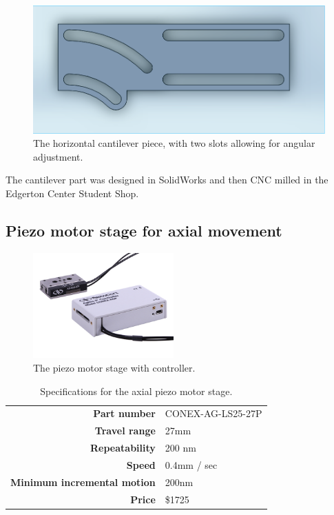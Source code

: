 \begin{figure}[h!]
\centering
\includegraphics[width=1.0\textwidth]{Images/Alignment/horizontal_part.png}
\caption{The horizontal cantilever piece, with two slots allowing for angular adjustment.}
\end{figure}

The cantilever part was designed in SolidWorks and then CNC milled in the Edgerton Center Student Shop.

\subsection{Piezo motor stage for axial movement}

\begin{figure}[h!]
\centering
\includegraphics[width=0.48\textwidth]{Images/System/z-stage.jpg}
\caption{The piezo motor stage with controller.}
\end{figure}

\begin{table}[h!]
\centering
\begin{tabular}{ >{\bf}r | l}
Part number & CONEX-AG-LS25-27P\\
Travel range & 27mm  \\
Repeatability & 200 nm \\
Speed & 0.4mm / sec \\
Minimum incremental motion & 200nm \\
Price & \$1725 \\
\end{tabular}
\caption{Specifications for the axial piezo motor stage.}
\end{table}

